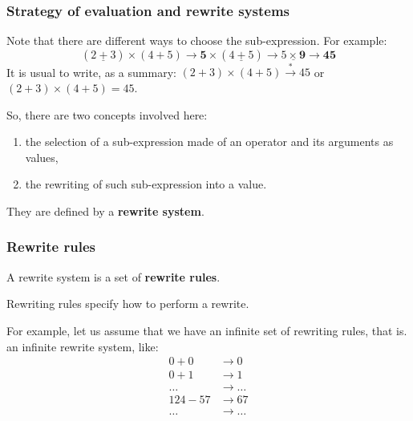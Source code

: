\documentclass[compress,dvipdfmx]{beamer}
\begin{document}
%
\begin{frame}
  \frametitle{Strategy of evaluation and rewrite systems}

  Note that there are different ways to choose the sub-expression. For
  example:
  \begin{equation*}
    (\underline{2+3}) \times (4+5) \rightarrow \textbf{5} \times
    (\underline{4+5}) \rightarrow \underline{5 \times \textbf{9}}
    \rightarrow \textbf{45}
  \end{equation*}
  It is usual to write, as a summary: \((2+3)\times(4+5)
  \xrightarrow{*} 45\) or \((2+3)\times(4+5)=45\).

  \bigskip

  So, there are two concepts involved here:
  \begin{enumerate}

    \item the selection of a sub-expression made of an operator and
      its arguments as values,

    \item the rewriting of such sub-expression into a value.

  \end{enumerate}
  They are defined by a \textbf{rewrite system}.

\end{frame}


%
\begin{frame}
  \frametitle{Rewrite rules}

  A rewrite system is a set of \textbf{rewrite rules}.

  \bigskip

  Rewriting rules specify how to perform a rewrite.

  \bigskip

  For example, let us assume that we have an infinite set of rewriting
  rules, that is. an infinite rewrite system, like:
  \begin{align*}
    0 + 0 & \rightarrow 0\\
    0 + 1 & \rightarrow 1\\
    \dots & \rightarrow \dots\\
    124 - 57 & \rightarrow 67\\
    \dots & \rightarrow \dots
  \end{align*}

\end{frame}
\end{document}
